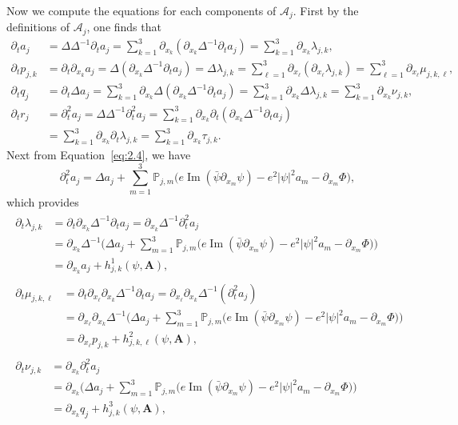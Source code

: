 \documentclass[10pt]{amsart}
\theoremstyle{definition}\newtheorem{defi}[theo]{Definition}\newtheorem{rema}[theo]{Remark}\newtheorem{exam}[theo]{Example}\newtheorem{exem}[theo]{Example}\newtheorem{nota}[theo]{Notation}
\newcommand{\BA}{\mathbf{A}}
\DeclareMathOperator{\IM}{Im}
\begin{document}
Now we compute the equations for each components of $\mathcal{A}_j$. First by the definitions of $\mathcal{A}_j$, one finds that
\begin{align*}
\partial_t a_j &= \Delta \Delta^{-1} \partial_t a_j = \sum_{k=1}^3 \partial_{x_k} (\partial_{x_k} \Delta^{-1} \partial_t a_j) = \sum_{k=1}^3 \partial_{x_k} \lambda_{j,k}, \\
\partial_t p_{j,k} &= \partial_t \partial_{x_k} a_j = \Delta (\partial_{x_k} \Delta^{-1} \partial_t a_j) = \Delta \lambda_{j,k} = \sum_{\ell=1}^3 \partial_{x_\ell} (\partial_{x_\ell} \lambda_{j,k}) = \sum_{\ell=1}^3 \partial_{x_\ell} \mu_{j,k,\ell}, \\
\partial_t q_j &= \partial_t \Delta a_j = \sum_{k=1}^3 \partial_{x_k} \Delta (\partial_{x_k} \Delta^{-1} \partial_t a_j) =\sum_{k=1}^3 \partial_{x_k} \Delta \lambda_{j,k} =\sum_{k=1}^3 \partial_{x_k} \nu_{j,k}, \\
\partial_t r_j &= \partial_t^2 a_j = \Delta \Delta^{-1} \partial_t^2 a_j = \sum_{k=1}^3 \partial_{x_k} \partial_t (\partial_{x_k} \Delta^{-1} \partial_t a_j) \\
&= \sum_{k=1}^3 \partial_{x_k} \partial_t \lambda_{j,k} =\sum_{k=1}^3 \partial_{x_k} \tau_{j,k}.
\end{align*}
Next from Equation~\eqref{eq:2.4}, we have
\[
\partial_t^2 a_j = \Delta a_j + \sum_{m=1}^3 {\mathbb P}_{j,m}
\Big(e \IM (\bar{\psi} \partial_{x_m} \psi)-e^2|\psi|^2 a_m
-\partial_{x_m} \Phi \Big),
\]
which provides
\begin{gather*}
\begin{aligned}
\partial_t \lambda_{j,k} &= \partial_t \partial_{x_k} \Delta^{-1} \partial_t a_j = \partial_{x_k} \Delta^{-1} \partial_t^2 a_j \\
&= \partial_{x_k} \Delta^{-1} \Big(\Delta a_j + \sum_{m=1}^3 {\mathbb P}_{j,m}
\Big(e \IM (\bar{\psi} \partial_{x_m} \psi)-e^2|\psi|^2 a_m -\partial_{x_m} \Phi \Big) \Big) \\
&= \partial_{x_k} a_j + h_{j,k}^1 (\psi, \BA),
\end{aligned}\\[1.25em]
\begin{aligned}
\partial_t \mu_{j,k,\ell} &= \partial_t \partial_{x_\ell} \partial_{x_k} \Delta^{-1} \partial_t a_j = \partial_{x_\ell} \partial_{x_k} \Delta^{-1} (\partial_t^2 a_j) \\
&= \partial_{x_\ell} \partial_{x_k} \Delta^{-1}
\Big(\Delta a_j + \sum_{m=1}^3 {\mathbb P}_{j,m}
\Big(e \IM (\bar{\psi} \partial_{x_m} \psi)-e^2|\psi|^2 a_m -\partial_{x_m} \Phi \Big) \Big) \\
&= \partial_{x_\ell} p_{j,k} +h_{j,k,\ell}^2 (\psi,\BA),
\end{aligned}\\[1.25em]
\begin{aligned}
\partial_t \nu_{j,k} &= \partial_{x_k} \partial_t^2 a_j \\
&= \partial_{x_k}
\Big(\Delta a_j + \sum_{m=1}^3 {\mathbb P}_{j,m}
\Big(e \IM (\bar{\psi} \partial_{x_m} \psi)-e^2|\psi|^2 a_m -\partial_{x_m} \Phi \Big) \Big) \\
&= \partial_{x_k} q_j +h_{j,k}^3(\psi,\BA),
\end{aligned}
\end{gather*}
\end{document}
